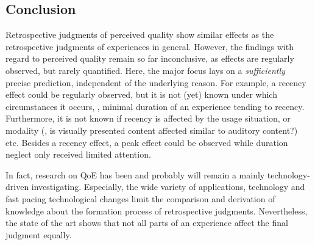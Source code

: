 \subsection{Conclusion}
Retrospective judgments of perceived quality show similar effects as the retrospective judgments of experiences in general.
However, the findings with regard to perceived quality remain so far inconclusive, as effects are regularly observed, but rarely quantified.
Here, the major focus lays on a \emph{sufficiently} precise prediction, independent of the underlying reason.
For example, a recency effect could be regularly observed, but it is not (yet) known under which circumstances it occurs, \eg, minimal duration of an experience tending to recency.
Furthermore, it is not known if recency is affected by the usage situation, or modality (\eg, is visually presented content affected similar to auditory content?) etc.
Besides a recency effect, a peak effect could be observed while duration neglect only received limited attention.

In fact, research on \ac{QoE} has been and probably will remain a mainly technology-driven investigating.
Especially, the wide variety of applications, technology and fast pacing technological changes limit the comparison and derivation of knowledge about the formation process of retrospective judgments.
Nevertheless, the state of the art shows that not all parts of an experience affect the final judgment equally.

